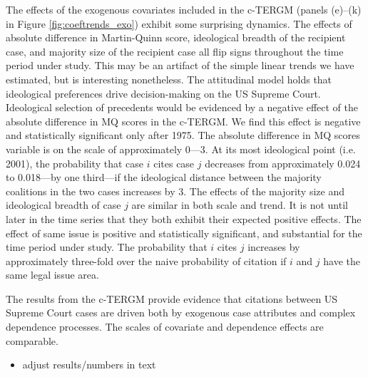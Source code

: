 \documentclass[headsepline=true, abstracton]{scrartcl}
\begin{document}
The effects of the exogenous covariates included in the c-TERGM (panels (e)--(k) in Figure \ref{fig:coeftrends_exo}) exhibit some surprising dynamics. The effects of absolute difference in Martin-Quinn score, ideological breadth of the recipient case, and majority size of the recipient case all flip signs throughout the time period under study. This may be an artifact of the simple linear trends we have estimated, but is interesting nonetheless. The attitudinal model holds that ideological preferences drive decision-making on the US Supreme Court. Ideological selection of precedents would be evidenced by a negative effect of the absolute difference in MQ scores in the c-TERGM. We find this effect is negative and statistically significant only after 1975. The absolute difference in MQ scores variable is on the scale of approximately 0---3. At its most ideological point (i.e. 2001), the probability that case $i$ cites case $j$ decreases from approximately 0.024 to 0.018---by one third---if the ideological distance between the majority coalitions in the two cases increases by 3. The effects of the majority size and ideological breadth of case $j$ are similar in both scale and trend. It is not until later in the time series that they both exhibit their expected positive effects. The effect of same issue is positive and statistically significant, and substantial for the time period under study. The probability that $i$ cites $j$ increases by approximately three-fold over the naive probability of citation if $i$ and $j$ have the same legal issue area.

The results from the c-TERGM provide evidence that citations between US Supreme Court cases are driven both by exogenous case attributes and complex dependence processes. The scales of covariate and dependence effects are comparable. 


\begin{itemize}
\item adjust results/numbers in text
\end{itemize}
\end{document}
